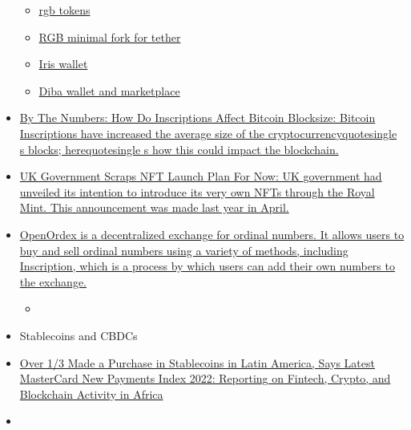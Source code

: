 \begin{itemize}
  \begin{itemize}
   
  \item
    \href{https://twitter.com/iris_wallet/status/1639189676845047808}{rgb
    tokens}
  \item
    \href{https://t.me/rgbtelegram/36013}{RGB minimal fork for tether}
  \item
    \href{https://play.google.com/store/apps/details?id=com.iriswallet.testnet}{Iris
    wallet}
  \item
    \href{https://diba.io/}{Diba wallet and marketplace}
  \end{itemize}
\item
  \href{https://bitcoinist.com/the-numbers-inscriptions-affect-bitcoin-blocksize/}{By
  The Numbers: How Do Inscriptions Affect Bitcoin Blocksize: Bitcoin
  Inscriptions have increased the average size of the
  cryptocurrencyquotesingle s blocks; herequotesingle s how
  this could impact the blockchain.}
\item
  \href{https://bitcoinist.com/uk-government-scraps-nft-launch-plan-for-now/}{UK
  Government Scraps NFT Launch Plan For Now: UK government had unveiled
  its intention to introduce its very own NFTs through the Royal Mint.
  This announcement was made last year in April.}
\item
  \href{https://openordex.org/}{OpenOrdex is a decentralized exchange
  for ordinal numbers. It allows users to buy and sell ordinal numbers
  using a variety of methods, including Inscription, which is a process
  by which users can add their own numbers to the exchange.}
  \begin{itemize}
  \item
  \end{itemize}
\item
  Stablecoins and CBDCs
\item
  \href{https://bitcoinke.io/2022/07/latin-america-in-mastercard-new-payments-index-2022/}{Over
  1/3 Made a Purchase in Stablecoins in Latin America, Says Latest
  MasterCard New Payments Index 2022: Reporting on Fintech, Crypto, and
  Blockchain Activity in Africa}
\item
  \begin{itemize}
   

\end{itemize}
\end{itemize}
